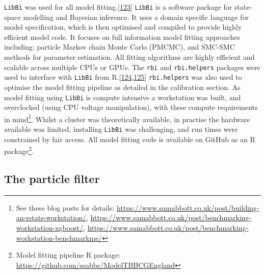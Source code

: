 \documentclass[11pt,twoside]{bristolthesis}
\begin{document}
  \texttt{LibBi} was used for all model fitting.{[}\protect\hyperlink{ref-Murray2015}{123}{]} \texttt{LibBi} is a software package for state-space modelling and Bayesian inference. It uses a domain specific language for model specification, which is then optimised and compiled to provide highly efficient model code. It focuses on full information model fitting approaches including: particle Markov chain Monte Carlo (PMCMC), and SMC-SMC methods for parameter estimation. All fitting algorithms are highly efficient and scalable across multiple CPUs or GPUs. The \texttt{rbi} and \texttt{rbi.helpers} packages were used to interface with \texttt{LibBi} from R.{[}\protect\hyperlink{ref-Funk:2019ud}{124},\protect\hyperlink{ref-Funk:2019uw}{125}{]} \texttt{rbi.helpers} was also used to optimise the model fitting pipeline as detailed in the calibration section. As model fitting using \texttt{LibBi} is compute intensive a workstation was built, and overclocked (using CPU voltage manipulation), with these compute requirements in mind\footnote{See these blog posts for details: \url{https://www.samabbott.co.uk/post/building-an-rstats-workstation/}, \url{https://www.samabbott.co.uk/post/benchmarking-workstation-xgboost/}, \url{https://www.samabbott.co.uk/post/benchmarking-workstation-benchmarkme/}}. Whilst a cluster was theoretically available, in practise the hardware available was limited, installing \texttt{LibBi} was challenging, and run times were constrained by fair access. All model fitting code is available on GitHub as an R package\footnote{Model fitting pipeline R package: \url{https://github.com/seabbs/ModelTBBCGEngland}}.
  
  \hypertarget{particle-filter}{%
  \subsection{The particle filter}\label{particle-filter}}
  
\end{document}
